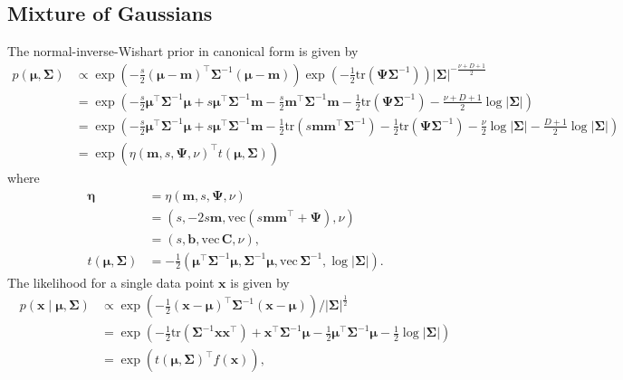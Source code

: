 \documentclass[a4paper]{article}
\begin{document}
	\subsection*{Mixture of Gaussians}

	The normal-inverse-Wishart prior in canonical form is given by
	\begin{align}
		p(\bm{\mu}, \bm{\Sigma})
			&\propto \exp\left( -\frac{s}{2} (\bm{\mu} - \mathbf{m})^\top \bm{\Sigma}^{-1} (\bm{\mu} - \mathbf{m}) \right) 
			\exp\left( -\frac{1}{2} \text{tr}(\bm{\Psi}\bm{\Sigma}^{-1}) \right) |\bm{\Sigma}|^{-\frac{\nu + D + 1}{2}} \\
			&= \exp\left( -\frac{s}{2} \bm{\mu}^\top \bm{\Sigma}^{-1} \bm{\mu} + s \bm{\mu}^\top \bm{\Sigma}^{-1} \mathbf{m}
			- \frac{s}{2} \mathbf{m}^\top\bm{\Sigma}^{-1}\mathbf{m} - \frac{1}{2} \text{tr}(\bm{\Psi}\bm{\Sigma}^{-1})
			- \frac{\nu + D + 1}{2} \log |\bm{\Sigma}| \right) \\
		&= \exp\left( -\frac{s}{2} \bm{\mu}^\top \bm{\Sigma}^{-1} \bm{\mu} + s \bm{\mu}^\top \bm{\Sigma}^{-1} \mathbf{m}
			- \frac{1}{2} \text{tr}(s\mathbf{m}\mathbf{m}^\top\bm{\Sigma}^{-1}) - \frac{1}{2} \text{tr}(\bm{\Psi}\bm{\Sigma}^{-1})
			- \frac{\nu}{2} \log |\bm{\Sigma}| - \frac{D + 1}{2} \log |\bm{\Sigma}| \right) \\
		&= \exp\left( \eta(\mathbf{m}, s, \bm{\Psi}, \nu)^\top t(\bm{\mu}, \bm{\Sigma}) \right)
	\end{align}
	where
	\begin{align}
		\bm{\eta} 
			&= \eta(\mathbf{m}, s, \bm{\Psi}, \nu) \\
			&= \left( s, -2s\mathbf{m}, \text{vec}(s\mathbf{m}\mathbf{m}^\top + \bm{\Psi}), \nu \right) \\
			&= \left( s, \mathbf{b}, \text{vec}\, \mathbf{C}, \nu \right), \\
		t(\bm{\mu}, \bm{\Sigma})
			&= -\frac{1}{2} \left( \bm{\mu}^\top \bm{\Sigma}^{-1} \bm{\mu}, \bm{\Sigma}^{-1}\bm{\mu}, \text{vec}\, \bm{\Sigma}^{-1}, \log|\bm{\Sigma}| \right).
	\end{align}
	The likelihood for a single data point $\mathbf{x}$ is given by
	\begin{align}
		p(\mathbf{x} \mid \bm{\mu}, \bm{\Sigma})
			&\propto \exp\left( -\frac{1}{2} (\mathbf{x} - \bm{\mu})^\top \bm{\Sigma}^{-1} (\mathbf{x} - \bm{\mu}) \right) / |\bm{\Sigma}|^\frac{1}{2} \\
			&= \exp\left( -\frac{1}{2} \text{tr}\left(\bm{\Sigma}^{-1} \mathbf{x}\mathbf{x}^\top \right) + \mathbf{x}^\top \bm{\Sigma}^{-1}\bm{\mu} - \frac{1}{2} \bm{\mu}^\top \bm{\Sigma}^{-1} \bm{\mu} - \frac{1}{2} \log |\bm{\Sigma}| \right) \\
			&= \exp\left( t(\bm{\mu}, \bm{\Sigma})^\top f(\mathbf{x}) \right),
	\end{align}
\end{document}
